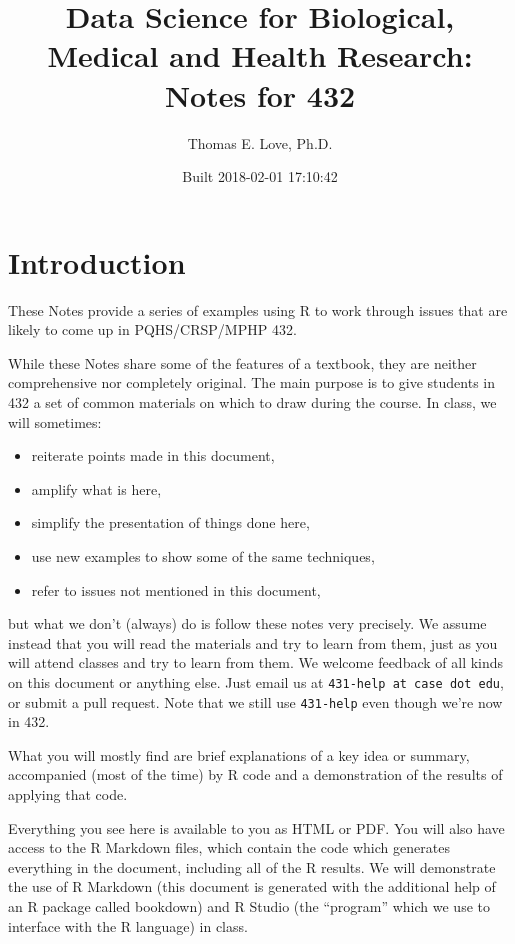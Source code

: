 \documentclass[]{book}
\title{Data Science for Biological, Medical and Health Research: Notes for 432}
\author{Thomas E. Love, Ph.D.}
\date{Built 2018-02-01 17:10:42}
\providecommand{\tightlist}{%
  \setlength{\itemsep}{0pt}\setlength{\parskip}{0pt}}
\theoremstyle{definition}
\theoremstyle{definition}
\theoremstyle{definition}
\theoremstyle{remark}
\begin{document}
\maketitle

{
\setcounter{tocdepth}{1}
\tableofcontents
}
\chapter*{Introduction}\label{introduction}

These Notes provide a series of examples using R to work through issues
that are likely to come up in PQHS/CRSP/MPHP 432.

While these Notes share some of the features of a textbook, they are
neither comprehensive nor completely original. The main purpose is to
give students in 432 a set of common materials on which to draw during
the course. In class, we will sometimes:

\begin{itemize}
\tightlist
\item
  reiterate points made in this document,
\item
  amplify what is here,
\item
  simplify the presentation of things done here,
\item
  use new examples to show some of the same techniques,
\item
  refer to issues not mentioned in this document,
\end{itemize}

but what we don't (always) do is follow these notes very precisely. We
assume instead that you will read the materials and try to learn from
them, just as you will attend classes and try to learn from them. We
welcome feedback of all kinds on this document or anything else. Just
email us at \texttt{431-help\ at\ case\ dot\ edu}, or submit a pull
request. Note that we still use \texttt{431-help} even though we're now
in 432.

What you will mostly find are brief explanations of a key idea or
summary, accompanied (most of the time) by R code and a demonstration of
the results of applying that code.

Everything you see here is available to you as HTML or PDF. You will
also have access to the R Markdown files, which contain the code which
generates everything in the document, including all of the R results. We
will demonstrate the use of R Markdown (this document is generated with
the additional help of an R package called bookdown) and R Studio (the
``program'' which we use to interface with the R language) in class.
\end{document}
